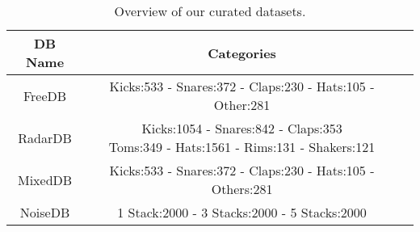 \documentclass[\main/thesis.tex]{subfiles}
\begin{document}
\begin{table}[]
\begin{tabular}{ |c|c|c| } 
\hline
DB Name & Categories \\ \hline
FreeDB  & Kicks:533 - Snares:372 - Claps:230 - Hats:105 - Other:281            \\ \hline
RadarDB & \makecell{Kicks:1054 - Snares:842 - Claps:353 \\ Toms:349 - Hats:1561 - Rims:131 - Shakers:121} \\ \hline
MixedDB & Kicks:533 - Snares:372 - Claps:230 - Hats:105 - Others:281                     \\ \hline
NoiseDB & 1 Stack:2000 - 3 Stacks:2000 - 5 Stacks:2000                         \\ \hline
\end{tabular}
    \caption{Overview of our curated datasets.}
    \label{table:all_db}
\end{table}








\end{document}
